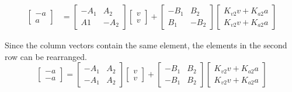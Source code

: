 \begin{align*}
  \begin{bmatrix}
    -a \\
    a
  \end{bmatrix} &=
    \begin{bmatrix}
      -A_1 & A_2 \\
      A1 & -A_2
    \end{bmatrix}
    \begin{bmatrix}
      v \\
      v
    \end{bmatrix} +
    \begin{bmatrix}
      -B_1 & B_2 \\
      B_1 & -B_2
    \end{bmatrix}
    \begin{bmatrix}
      K_{v2} v + K_{a2} a \\
      K_{v2} v + K_{a2} a
    \end{bmatrix}
\end{align*}

Since the column vectors contain the same element, the elements in the second
row can be rearranged.
\begin{equation*}
  \begin{bmatrix}
    -a \\
    -a
  \end{bmatrix} =
  \begin{bmatrix}
    -A_1 & A_2 \\
    -A_1 & A_2
  \end{bmatrix}
  \begin{bmatrix}
    v \\
    v
  \end{bmatrix} +
  \begin{bmatrix}
    -B_1 & B_2 \\
    -B_1 & B_2
  \end{bmatrix}
  \begin{bmatrix}
    K_{v2} v + K_{a2} a \\
    K_{v2} v + K_{a2} a
  \end{bmatrix}
\end{equation*}

